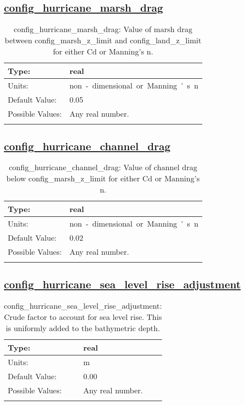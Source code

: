 \subsection[config\_hurricane\_marsh\_drag]{\hyperref[sec:nm_tab_hurricane]{config\_hurricane\_marsh\_drag}}
\label{subsec:nm_sec_config_hurricane_marsh_drag}
\begin{center}
\begin{longtable}{| p{2.0in} || p{4.0in} |}
    \hline
    Type: & real \\
    \hline
    Units: & \si{non-dimensional.or.Manning's.n} \\
    \hline
    Default Value: & 0.05 \\
    \hline
    Possible Values: & Any real number. \\
    \hline
    \caption{config\_hurricane\_marsh\_drag: Value of marsh drag between config\_marsh\_z\_limit and config\_land\_z\_limit for either Cd or Manning's n.}
\end{longtable}
\end{center}
\subsection[config\_hurricane\_channel\_drag]{\hyperref[sec:nm_tab_hurricane]{config\_hurricane\_channel\_drag}}
\label{subsec:nm_sec_config_hurricane_channel_drag}
\begin{center}
\begin{longtable}{| p{2.0in} || p{4.0in} |}
    \hline
    Type: & real \\
    \hline
    Units: & \si{non-dimensional.or.Manning's.n} \\
    \hline
    Default Value: & 0.02 \\
    \hline
    Possible Values: & Any real number. \\
    \hline
    \caption{config\_hurricane\_channel\_drag: Value of channel drag below config\_marsh\_z\_limit for either Cd or Manning's n.}
\end{longtable}
\end{center}
\subsection[config\_hurricane\_sea\_level\_rise\_adjustment]{\hyperref[sec:nm_tab_hurricane]{config\_hurricane\_sea\_level\_rise\_adjustment}}
\label{subsec:nm_sec_config_hurricane_sea_level_rise_adjustment}
\begin{center}
\begin{longtable}{| p{2.0in} || p{4.0in} |}
    \hline
    Type: & real \\
    \hline
    Units: & \si{m} \\
    \hline
    Default Value: & 0.00 \\
    \hline
    Possible Values: & Any real number. \\
    \hline
    \caption{config\_hurricane\_sea\_level\_rise\_adjustment: Crude factor to account for sea level rise. This is uniformly added to the bathymetric depth.}
\end{longtable}
\end{center}
